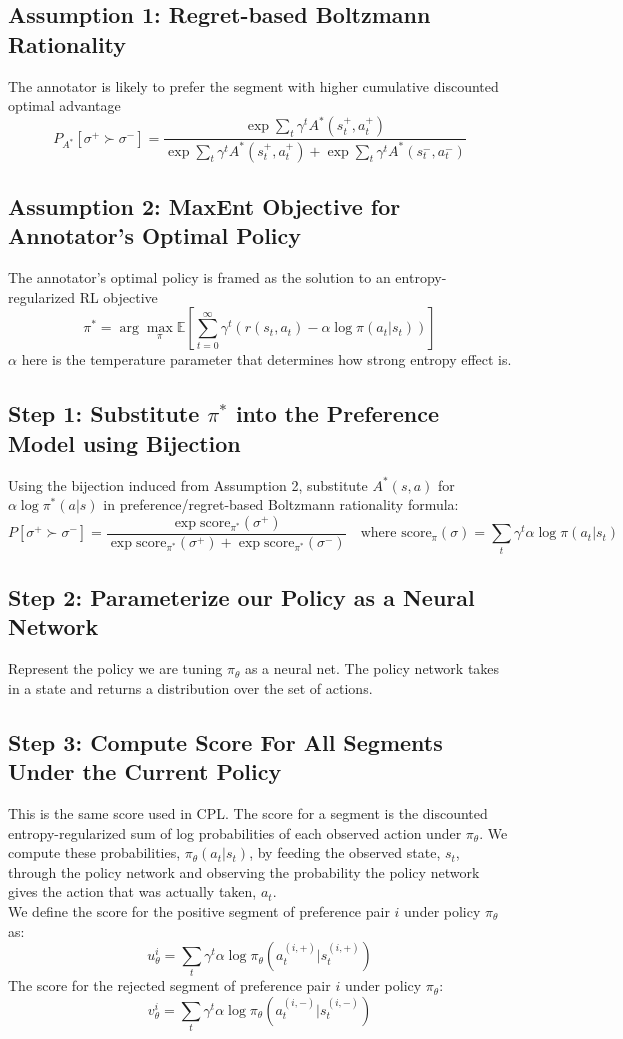 \documentclass{article}
\begin{document}
\subsection*{Assumption 1: Regret-based Boltzmann Rationality}
The annotator is likely to prefer the segment with higher cumulative discounted optimal advantage
$$P_{A^*}[\sigma^+ \succ \sigma^-] = \frac{\exp \sum_t \gamma^t A^*(s_t^+, a_t^+)}{\exp \sum_t \gamma^t A^*(s_t^+, a_t^+) + \exp \sum_t \gamma^t A^*(s_t^-, a_t^-)}$$

\subsection*{Assumption 2: MaxEnt Objective for Annotator's Optimal Policy}
The annotator's optimal policy is framed as the solution to an entropy-regularized RL objective
$$\pi^* = \arg\max_\pi \mathbb{E} \left[ \sum_{t=0}^\infty \gamma^t (r(s_t, a_t) - \alpha \log \pi(a_t|s_t)) \right]$$
$\alpha$ here is the temperature parameter that determines how strong entropy effect is.\\

\subsection*{Step 1: Substitute $\pi^*$ into the Preference Model using Bijection}
Using the bijection induced from Assumption 2, substitute $A^*(s, a)$ for $\alpha \log \pi^*(a|s)$ in preference/regret-based Boltzmann rationality formula:
$$P[\sigma^+ \succ \sigma^-] = \frac{\exp \text{score}_{\pi^*}(\sigma^+)}{\exp \text{score}_{\pi^*}(\sigma^+) + \exp \text{score}_{\pi^*}(\sigma^-)} \quad \text{where } \text{score}_\pi(\sigma) = \sum_t \gamma^t \alpha \log \pi(a_t|s_t)$$

\subsection*{Step 2: Parameterize our Policy as a Neural Network}
Represent the policy we are tuning $\pi_\theta$ as a neural net. The policy network takes in a state and returns a distribution over the set of actions.

\subsection*{Step 3: Compute Score For All Segments Under the Current Policy}
This is the same score used in CPL. The score for a segment is the discounted entropy-regularized sum of log probabilities of each observed action under $\pi_\theta$. We compute these probabilities, $\pi_\theta(a_t|s_t)$, by feeding the observed state, $s_t$, through the policy network and observing the probability the policy network gives the action that was actually taken, $a_t$.\\
We define the score for the positive segment of preference pair $i$ under policy $\pi_\theta$ as:
$$u_\theta^i=\sum_{t}\gamma^t \alpha \log \pi_\theta(a_t^{(i,+)}|s_t^{(i,+)})$$
The score for the rejected segment of preference pair $i$ under policy $\pi_\theta$:\\
$$v_\theta^i=\sum_{t}\gamma^t \alpha \log \pi_\theta(a_t^{(i,-)}|s_t^{(i,-)})$$
\end{document}
